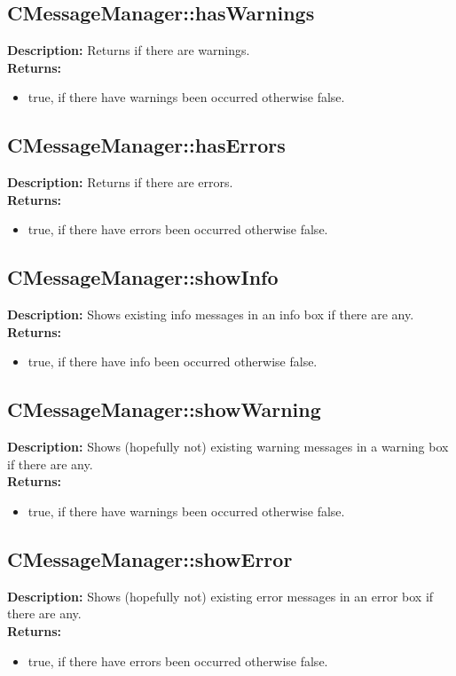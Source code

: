\subsection{CMessageManager::hasWarnings}
\textbf{Description:} Returns if there are warnings.\\
\textbf{Returns:}
\begin{itemize}
\item true, if there have warnings been occurred otherwise false.
\end{itemize}

\subsection{CMessageManager::hasErrors}
\textbf{Description:} Returns if there are errors.\\
\textbf{Returns:}
\begin{itemize}
\item true, if there have errors been occurred otherwise false.
\end{itemize}

\subsection{CMessageManager::showInfo}
\textbf{Description:} Shows existing info messages in an info box if there are any.\\
\textbf{Returns:}
\begin{itemize}
\item true, if there have info been occurred otherwise false.
\end{itemize}

\subsection{CMessageManager::showWarning}
\textbf{Description:} Shows (hopefully not) existing warning messages in a warning box if there are any.\\
\textbf{Returns:}
\begin{itemize}
\item true, if there have warnings been occurred otherwise false.
\end{itemize}

\subsection{CMessageManager::showError}
\textbf{Description:} Shows (hopefully not) existing error messages in an error box if there are any.\\
\textbf{Returns:}
\begin{itemize}
\item true, if there have errors been occurred otherwise false.
\end{itemize}

